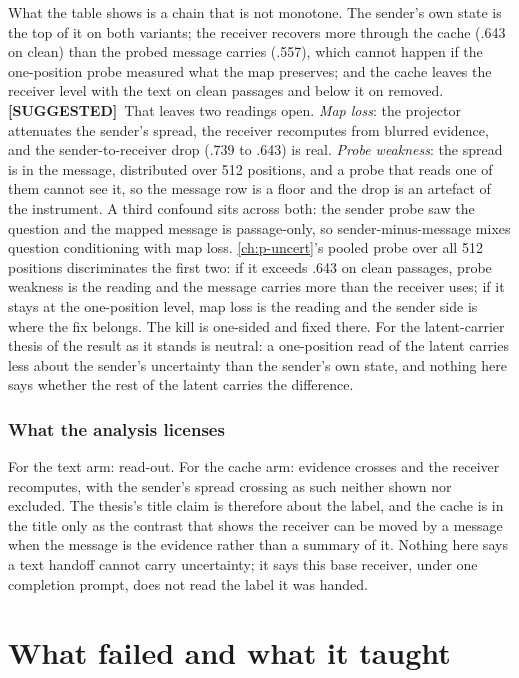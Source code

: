 \documentclass[11pt,a4paper]{report}
\newcommand{\SUGG}{\textcolor{suggc}{\textbf{\scriptsize[SUGGESTED]}}}
\begin{document}
What the table shows is a chain that is not monotone. The sender's own state is the top of it on both variants; the receiver recovers more through the cache (.643 on clean) than the probed message carries (.557), which cannot happen if the one-position probe measured what the map preserves; and the cache leaves the receiver level with the text on clean passages and below it on removed. \SUGG\ That leaves two readings open. \emph{Map loss}: the projector attenuates the sender's spread, the receiver recomputes from blurred evidence, and the sender-to-receiver drop (.739 to .643) is real. \emph{Probe weakness}: the spread is in the message, distributed over 512 positions, and a probe that reads one of them cannot see it, so the message row is a floor and the drop is an artefact of the instrument. A third confound sits across both: the sender probe saw the question and the mapped message is passage-only, so sender-minus-message mixes question conditioning with map loss. \cref{ch:p-uncert}'s pooled probe over all 512 positions discriminates the first two: if it exceeds .643 on clean passages, probe weakness is the reading and the message carries more than the receiver uses; if it stays at the one-position level, map loss is the reading and the sender side is where the fix belongs. The kill is one-sided and fixed there. For the latent-carrier thesis of \citet{2606.20662} the result as it stands is neutral: a one-position read of the latent carries less about the sender's uncertainty than the sender's own state, and nothing here says whether the rest of the latent carries the difference.

\section{What the analysis licenses}

For the text arm: read-out. For the cache arm: evidence crosses and the receiver recomputes, with the sender's spread crossing as such neither shown nor excluded. The thesis's title claim is therefore about the label, and the cache is in the title only as the contrast that shows the receiver can be moved by a message when the message is the evidence rather than a summary of it. Nothing here says a text handoff cannot carry uncertainty; it says this base receiver, under one completion prompt, does not read the label it was handed.

\part{What failed and what it taught}
\label{part:failed}
\end{document}

